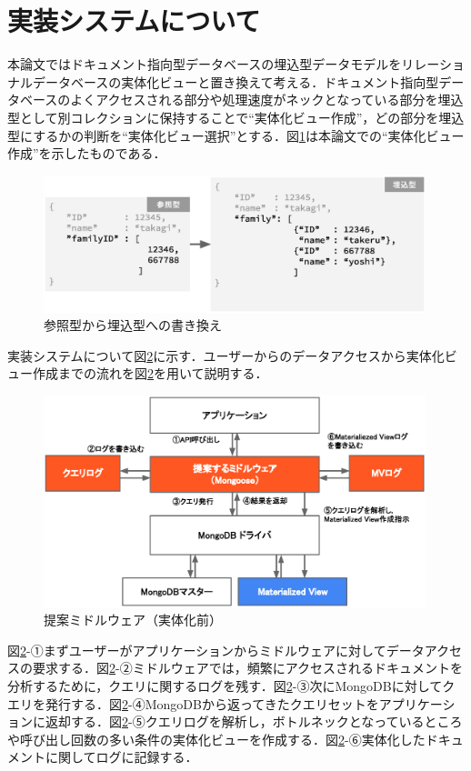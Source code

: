 \documentclass[a4paper,11pt]{ujreport}
\begin{document}
\section{実装システムについて}
本論文ではドキュメント指向型データベースの埋込型データモデルをリレーショナルデータベースの実体化ビューと置き換えて考える．ドキュメント指向型データベースのよくアクセスされる部分や処理速度がネックとなっている部分を埋込型として別コレクションに保持することで“実体化ビュー作成”，どの部分を埋込型にするかの判断を“実体化ビュー選択”とする．図\ref{ReferenceToEmbed}は本論文での“実体化ビュー作成”を示したものである．
\begin{figure}[htbp]
	\begin{center}
		\includegraphics[width=30em, trim=0 13em 0 0]{src/ReferenceToEmbed.eps} %
	\end{center}
	\caption{参照型から埋込型への書き換え}
	\label{ReferenceToEmbed}
\end{figure}

実装システムについて図\ref{Midleware}に示す．ユーザーからのデータアクセスから実体化ビュー作成までの流れを図\ref{Midleware}を用いて説明する．
\begin{figure}[h]
	\begin{center}
		\includegraphics[width=30em]{src/Midleware.eps}
	\end{center}
	\caption{提案ミドルウェア（実体化前）}
	\label{Midleware}
\end{figure}
図\ref{Midleware}-①まずユーザーがアプリケーションからミドルウェアに対してデータアクセスの要求する．図\ref{Midleware}-②ミドルウェアでは，頻繁にアクセスされるドキュメントを分析するために，クエリに関するログを残す．図\ref{Midleware}-③次にMongoDBに対してクエリを発行する．図\ref{Midleware}-④MongoDBから返ってきたクエリセットをアプリケーションに返却する．図\ref{Midleware}-⑤クエリログを解析し，ボトルネックとなっているところや呼び出し回数の多い条件の実体化ビューを作成する．図\ref{Midleware}-⑥実体化したドキュメントに関してログに記録する．
\end{document}
